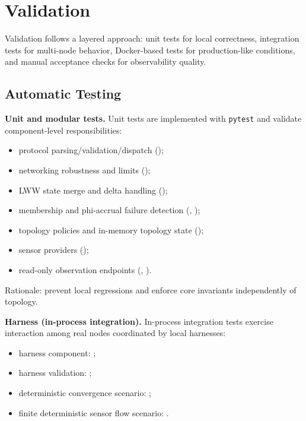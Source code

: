 \section{Validation}\label{validation}

Validation follows a layered approach: unit tests for local correctness, integration tests for multi-node behavior, Docker-based tests for production-like conditions, and manual acceptance checks for observability quality.

\subsection{Automatic Testing}\label{automatic-testing}

\textbf{Unit and modular tests.}
Unit tests are implemented with \texttt{pytest} and validate component-level responsibilities:
\begin{itemize}
  \item protocol parsing/validation/dispatch ();
  \item networking robustness and limits ();
  \item LWW state merge and delta handling ();
  \item membership and phi-accrual failure detection (, );
  \item topology policies and in-memory topology state ();
  \item sensor providers ();
  \item read-only observation endpoints (, ).
\end{itemize}

Rationale: prevent local regressions and enforce core invariants independently of topology.

\textbf{Harness (in-process integration).}
In-process integration tests exercise interaction among real nodes coordinated by local harnesses:
\begin{itemize}
  \item harness component: ;
  \item harness validation: ;
  \item deterministic convergence scenario: ;
  \item finite deterministic sensor flow scenario: .
\end{itemize}

